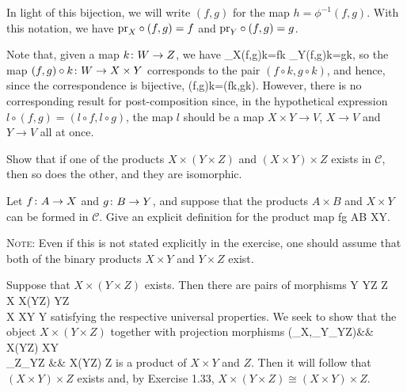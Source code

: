 In light of this bijection, we will write $(f,g)$ for the map $h=\phi^{-1}(f,g)$. With this notation, we have $\mathrm{pr}_X\circ(f,g)=f$ and $\mathrm{pr}_Y\circ(f,g)=g$.

Note that, given a map $k\colon W\to Z$, we have
\bse
\pr_X\circ(f,g)\circ k=f\circ k \qquad {} \qquad \pr_Y\circ(f,g)\circ k=g\circ k,
\ese
so the map $(f,g)\circ k\colon W\to X\times Y$ corresponds to the pair $(f\circ k,g\circ k)$, and hence, since the correspondence is bijective,
\bse
(f,g)\circ k=(f\circ k,g\circ k).
\ese
However, there is no corresponding result for post-composition since, in the hypothetical expression $l\circ (f,g)=(l\circ f,l\circ g)$, the map $l$ should be a map $X\times Y \to V$, $X\to V$ and $Y\to V$ all at once.
\es

\bx
\ben[label=(\alph*)]
\item Show that if one of the products $X\times(Y\times Z)$ and $(X\times Y)\times Z$ exists in $\mathcal{C}$, then so does the other, and they are isomorphic.
\item Let $f\colon A\to X$ and $g\colon B\to Y$, and suppose that the products $A\times B$ and $X\times Y$ can be formed in $\mathcal{C}$. Give an explicit definition for the product map
\bse
f\times g \cl A\times B \to X\times Y.
\ese
\een
\ex

\bs
{\scshape Note}: Even if this is not stated explicitly in the exercise, one should assume that both of the binary products $X\times Y$ and $Y\times Z$ exist. 
\ben[label=(\alph*)]
\item Suppose that $X\times(Y\times Z)$ exists. Then there are pairs of morphisms
Y  Y\times Z  Z\\
X  X\times (Y\times Z)  Y\times Z\\
X  X\times Y  Y
\ei
satisfying the respective universal properties. We seek to show that the object $X\times(Y\times Z)$ together with projection morphisms
(\pr_X,\pr_Y\circ\pr_{Y\times Z})\cl && X\times(Y\times Z) \longrightarrow X\times Y\\ 
\pr_Z\circ\pr_{Y\times Z} \cl &&  X\times(Y\times Z) \longrightarrow Z
\ei
is a product of $X\times Y$ and $Z$. Then it will follow that $(X\times Y)\times Z$ exists and, by Exercise 1.33, $X\times (Y\times Z)\cong (X\times Y)\times Z$.

